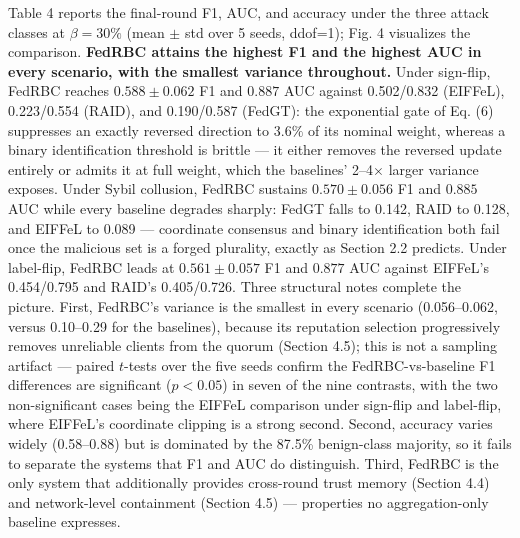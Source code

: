 \documentclass[cmc,article,submit,moreauthors,pdftex]{Definitions/tsp}
\begin{document}
Table 4 reports the final-round F1, AUC, and accuracy under the three attack classes at $\beta=30\%$ (mean $\pm$ std over 5 seeds, ddof=1); Fig. 4 visualizes the comparison. \textbf{FedRBC attains the highest F1 and the highest AUC in every scenario, with the smallest variance throughout.} Under sign-flip, FedRBC reaches $0.588 \pm 0.062$ F1 and $0.887$ AUC against 0.502/0.832 (EIFFeL), 0.223/0.554 (RAID), and 0.190/0.587 (FedGT): the exponential gate of Eq. (6) suppresses an exactly reversed direction to $3.6\%$ of its nominal weight, whereas a binary identification threshold is brittle --- it either removes the reversed update entirely or admits it at full weight, which the baselines' 2--4$\times$ larger variance exposes. Under Sybil collusion, FedRBC sustains $0.570 \pm 0.056$ F1 and $0.885$ AUC while every baseline degrades sharply: FedGT falls to 0.142, RAID to 0.128, and EIFFeL to 0.089 --- coordinate consensus and binary identification both fail once the malicious set is a forged plurality, exactly as Section 2.2 predicts. Under label-flip, FedRBC leads at $0.561 \pm 0.057$ F1 and $0.877$ AUC against EIFFeL's 0.454/0.795 and RAID's 0.405/0.726. Three structural notes complete the picture. First, FedRBC's variance is the smallest in every scenario (0.056--0.062, versus 0.10--0.29 for the baselines), because its reputation selection progressively removes unreliable clients from the quorum (Section 4.5); this is not a sampling artifact --- paired $t$-tests over the five seeds confirm the FedRBC-vs-baseline F1 differences are significant ($p<0.05$) in seven of the nine contrasts, with the two non-significant cases being the EIFFeL comparison under sign-flip and label-flip, where EIFFeL's coordinate clipping is a strong second. Second, accuracy varies widely (0.58--0.88) but is dominated by the 87.5\% benign-class majority, so it fails to separate the systems that F1 and AUC do distinguish. Third, FedRBC is the only system that additionally provides cross-round trust memory (Section 4.4) and network-level containment (Section 4.5) --- properties no aggregation-only baseline expresses.
\end{document}

